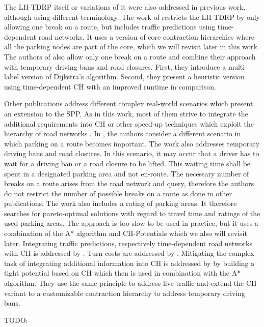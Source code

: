 The LH-TDRP itself or variations of it were also addressed in previous work, although using different terminology. The work of \cite{kleff:2017} restricts the LH-TDRP by only allowing one break on a route, but includes traffic predictions using time-dependent road networks. It uses a version of core contraction hierarchies where all the parking nodes are part of the core, which we will revisit later in this work. The authors of \cite{tuin:2018} also allow only one break on a route and combine their approach with temporary driving bans and road closures. First, they introduce a multi-label version of Dijkstra's algorithm. Second, they present a heuristic version using time-dependent CH with an improved runtime in comparison.

Other publications address different complex real-world scenarios which present an extension to the SPP. As in this work, most of them strive to integrate the additional requirements into CH or other speed-up techniques which exploit the hierarchy of road networks \cite{bast:2015}. In \cite{kleff:2020}, the authors consider a different scenario in which parking on a route becomes important. The work also addresses temporary driving bans and road closures. In this scenario, it may occur that a driver has to wait for a driving ban or a road closure to be lifted. This waiting time shall be spent in a designated parking area and not en-route. The necessary number of breaks on a route arises from the road network and query, therefore the authors do not restrict the number of possible breaks on a route as done in other publications. The work also includes a rating of parking areas. It therefore searches for pareto-optimal solutions with regard to travel time and ratings of the used parking areas. The approach is too slow to be used in practice, but it uses a combination of the A* algorithm and CH-Potentials which we also will revisit later. Integrating traffic predictions, respectively time-dependent road networks with CH is addressed by \cite{batz:2009,batz:2013}. Turn costs are addressed by \cite{geisberger:2011}. Mitigating the complex task of integrating additional information into CH is addressed by \cite{strasser:2021} by building a tight potential based on CH which then is used in combination with the A* algorithm. They use the same principle to address live traffic and extend the CH variant to a customizable contraction hierarchy \cite{dibbelt:2015} to address temporary driving bans.

TODO: \cite{mayerle:2020} \cite{vital:2019}